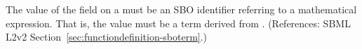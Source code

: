 The value of the  field on a \FunctionDefinition must be an
SBO identifier referring to a mathematical expression.  That is, the value
must be a term derived from \sbomathformula.  (References: SBML L2v2
Section~\ref{sec:functiondefinition-sboterm}.)
